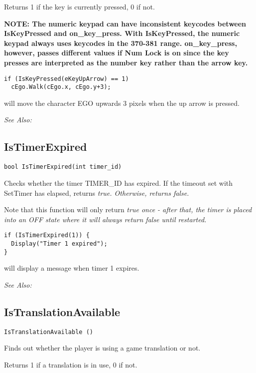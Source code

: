 Returns 1 if the key is currently pressed, 0 if not.

\bf{NOTE:} The numeric keypad can have inconsistent keycodes between IsKeyPressed
and on_key_press. With IsKeyPressed, the numeric keypad always uses keycodes in the 370-381
range. on_key_press, however, passes different values if Num Lock is on since the key
presses are interpreted as the number key rather than the arrow key.

\begin{verbatim}
if (IsKeyPressed(eKeyUpArrow) == 1)
  cEgo.Walk(cEgo.x, cEgo.y+3);
\end{verbatim}
will move the character EGO upwards 3 pixels when the up arrow is pressed.

\it{See Also:} 


\subsection{IsTimerExpired}\label{IsTimerExpired}%

\begin{verbatim}
bool IsTimerExpired(int timer_id)
\end{verbatim}
Checks whether the timer TIMER_ID has expired.
If the timeout set with SetTimer has elapsed, returns \it{true}.
Otherwise, returns \it{false}.

Note that this function will only return \it{true} once - after that, the timer
is placed into an OFF state where it will always return \it{false} until restarted.

\begin{verbatim}
if (IsTimerExpired(1)) {
  Display("Timer 1 expired");
}
\end{verbatim}
will display a message when timer 1 expires.

\it{See Also:} 


\subsection{IsTranslationAvailable}\label{IsTranslationAvailable}%

\begin{verbatim}
IsTranslationAvailable ()
\end{verbatim}
Finds out whether the player is using a game translation or not.

Returns 1 if a translation is in use, 0 if not.

